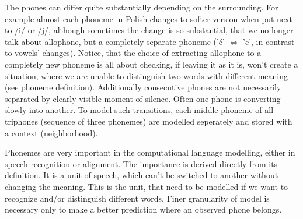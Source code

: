 \documentclass[12pt,a4paper,english]{article}
\begin{document}
The phones can differ quite substantially depending on the surrounding. For example almost each phoneme in Polish changes to softer version when put next to /i/ or /j/, although sometimes the change is so substantial, that we no longer talk about allophone, but a completely separate phoneme ('ć' $\iff$ 'c', in contrast to vowels' changes). Notice, that the choice of extracting allophone to a completely new phoneme is all about checking, if leaving it as it is, won't create a situation, where we are unable to distinguish two words with different meaning (see phoneme definition).
Additionally consecutive phones are not necessarily separated by clearly visible moment of silence. Often one phone is converting slowly into another. To model such transitions, each middle phoneme of all triphones (sequence of three phonemes) are modelled seperately and stored with a context (neighborhood). \newline
\newpage

Phonemes are very important in the computational language modelling, either in speech recognition or alignment. The importance is derived directly from its definition. It is a unit of speech, which can't be switched to another without changing the meaning. This is the unit, that need to be modelled if we want to recognize and/or distinguish different words. Finer granularity of model is necessary only to make a better prediction where an observed phone belongs.
\end{document}
